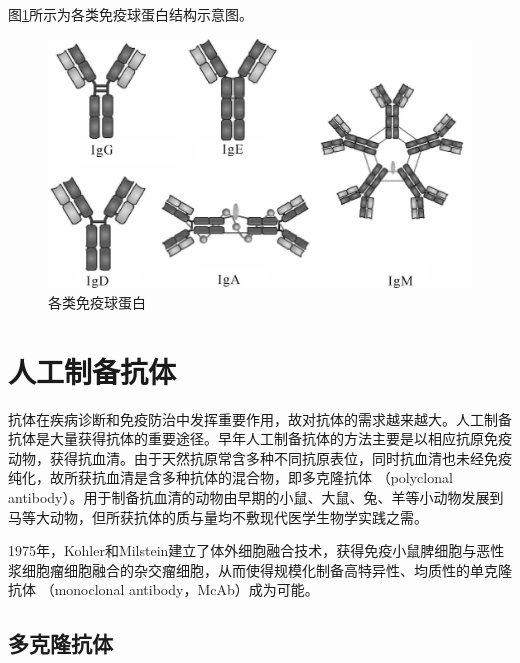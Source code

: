 图\ref{fig4-11}所示为各类免疫球蛋白结构示意图。

\begin{figure}[!htbp]
 \centering
 \includegraphics{./images/Image00071.jpg}
 \captionsetup{justification=centering}
 \caption{各类免疫球蛋白}
 \label{fig4-11}
  \end{figure} 

\section{人工制备抗体}

抗体在疾病诊断和免疫防治中发挥重要作用，故对抗体的需求越来越大。人工制备抗体是大量获得抗体的重要途径。早年人工制备抗体的方法主要是以相应抗原免疫动物，获得抗血清。由于天然抗原常含多种不同抗原表位，同时抗血清也未经免疫纯化，故所获抗血清是含多种抗体的混合物，即多克隆抗体
（polyclonal
antibody）。用于制备抗血清的动物由早期的小鼠、大鼠、兔、羊等小动物发展到马等大动物，但所获抗体的质与量均不敷现代医学生物学实践之需。

1975年，Kohler和Milstein建立了体外细胞融合技术，获得免疫小鼠脾细胞与恶性浆细胞瘤细胞融合的杂交瘤细胞，从而使得规模化制备高特异性、均质性的单克隆抗体
（monoclonal antibody，McAb）成为可能。


\subsection{多克隆抗体}

